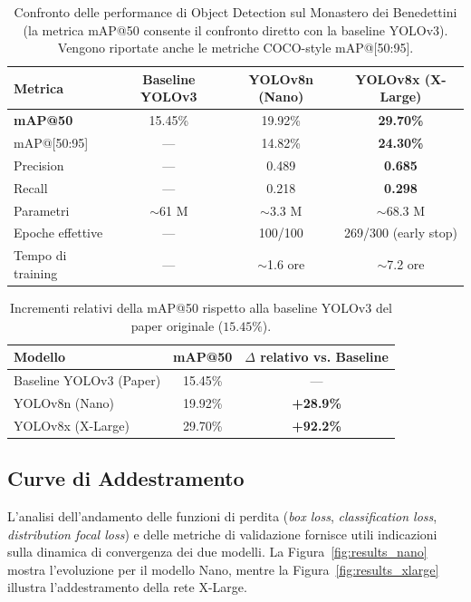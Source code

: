 \documentclass[a4paper,12pt]{report}
\begin{document}
\begin{table}[htbp]
\centering
\caption{Confronto delle performance di Object Detection sul Monastero dei Benedettini (la metrica mAP@50 consente il confronto diretto con la baseline YOLOv3). Vengono riportate anche le metriche COCO-style mAP@[50:95].}
\label{tab:results_main}
\begin{tabular}{lccc}
\toprule
\textbf{Metrica} & \textbf{Baseline YOLOv3 \cite{egoref}} & \textbf{YOLOv8n (Nano)} & \textbf{YOLOv8x (X-Large)} \\
\midrule
\textbf{mAP@50}         & 15.45\%   & 19.92\%   & \textbf{29.70\%} \\
mAP@[50:95]     & ---       & 14.82\%   & \textbf{24.30\%} \\
Precision       & ---       & 0.489     & \textbf{0.685}   \\
Recall          & ---       & 0.218     & \textbf{0.298}   \\
\midrule
Parametri       & $\sim$61 M & $\sim$3.3 M & $\sim$68.3 M \\
Epoche effettive & ---      & 100/100   & 269/300 (early stop) \\
Tempo di training & ---     & $\sim$1.6 ore & $\sim$7.2 ore \\
\bottomrule
\end{tabular}
\end{table}

\begin{table}[htbp]
\centering
\caption{Incrementi relativi della mAP@50 rispetto alla baseline YOLOv3 del paper originale ($15.45\%$).}
\label{tab:improvement}
\begin{tabular}{lcc}
\toprule
\textbf{Modello} & \textbf{mAP@50} & \textbf{$\Delta$ relativo vs. Baseline} \\
\midrule
Baseline YOLOv3 (Paper) & 15.45\% & --- \\
YOLOv8n (Nano)          & 19.92\% & \textbf{+28.9\%} \\
YOLOv8x (X-Large)       & 29.70\% & \textbf{+92.2\%} \\
\bottomrule
\end{tabular}
\end{table}

\FloatBarrier

\subsection{Curve di Addestramento}

L'analisi dell'andamento delle funzioni di perdita (\emph{box loss}, \emph{classification loss}, \emph{distribution focal loss}) e delle metriche di validazione fornisce utili indicazioni sulla dinamica di convergenza dei due modelli. La Figura~\ref{fig:results_nano} mostra l'evoluzione per il modello Nano, mentre la Figura~\ref{fig:results_xlarge} illustra l'addestramento della rete X-Large.
\end{document}
